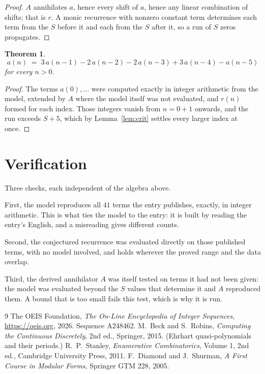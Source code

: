 \documentclass[11pt,a4paper]{article}
\theoremstyle{plain}
\newtheorem{theorem}{Theorem}
\theoremstyle{definition}
\begin{document}
\begin{proof}
$A$ annihilates $a$, hence every shift of $a$, hence any linear combination of shifts; that is
$r$. A monic recurrence with nonzero constant term determines each term from the $S$ before it
and each from the $S$ after it, so a run of $S$ zeros propagates.
\end{proof}

\begin{theorem}
\[
a(n)\;=\;3\,a(n-1) - 2\,a(n-2) - 2\,a(n-3) + 3\,a(n-4) - a(n-5)
\]
for every $n>0$.
\end{theorem}

\begin{proof}
The terms $a(0),\dots$ were computed exactly in integer arithmetic from the model, extended by
$A$ where the model itself was not evaluated, and $r(n)$ formed for each index. Those integers
vanish from $n=0+1$ onwards, and the run exceeds $S+5$, which by
Lemma~\ref{lem:crit} settles every larger index at once.
\end{proof}

\section{Verification}

Three checks, each independent of the algebra above.

First, the model reproduces all $41$ terms the entry publishes, exactly, in integer
arithmetic. This is what ties the model to the entry: it is built by reading the entry's
English, and a misreading gives different counts.

Second, the conjectured recurrence was evaluated directly on those published terms, with no
model involved, and holds wherever the proved range and the data overlap.

Third, the derived annihilator $A$ was itself tested on terms it had not been given: the model
was evaluated beyond the $S$ values that determine it and $A$ reproduced them. A bound that is
too small fails this test, which is why it is run.

\begin{thebibliography}{9}
 The OEIS Foundation, \emph{The On-Line Encyclopedia of Integer
Sequences}, \url{https://oeis.org}, 2026. Sequence A248462.
 M.~Beck and S.~Robins, \emph{Computing the Continuous Discretely},
2nd ed., Springer, 2015. (Ehrhart quasi-polynomials and their periods.)
 R.~P.~Stanley, \emph{Enumerative Combinatorics}, Volume 1, 2nd ed.,
Cambridge University Press, 2011.
 F.~Diamond and J.~Shurman, \emph{A First Course in Modular Forms},
Springer GTM 228, 2005.
\end{thebibliography}
\end{document}
